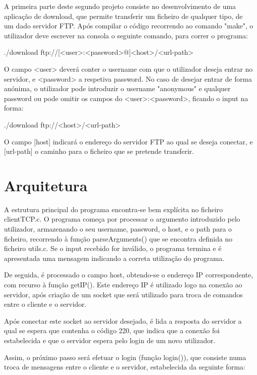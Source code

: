 \documentclass[article, a4paper, 11pt, oneside]{memoir}
\begin{document}
A primeira parte deste segundo projeto consiste no desenvolvimento de uma aplicação de download,
que permite transferir um ficheiro de qualquer tipo, de um dado servidor FTP. Após compilar o código
recorrendo ao comando "make", o utilizador deve escrever na consola o seguinte comando, para correr o programa:

./download ftp://[\textless user\textgreater :\textless password\textgreater @]\textless host\textgreater/\textless url-path\textgreater{}

O campo \textless user\textgreater{} deverá conter o username com que o utilizador deseja entrar no servidor, e \textless password\textgreater{} a respetiva password.
No caso de desejar entrar de forma anónima, o utilizador pode introduzir o username "anonymous" e qualquer password ou
pode omitir os campos do \textless user\textgreater :\textless password\textgreater{}, ficando o input na forma:

./download ftp://\textless host\textgreater /\textless url-path\textgreater{}

O campo [host] indicará o endereço do servidor FTP ao qual se deseja conectar, e [url-path] o caminho para o ficheiro que se pretende transferir.

\section{Arquitetura}

A estrutura principal do programa encontra-se bem explícita no ficheiro clientTCP.c.
O programa começa por processar o argumento introduzido pelo utilizador, armazenando o seu username,
password, o host, e o path para o ficheiro, recorrendo à função parseArguments() que se encontra definida no ficheiro utils.c.
Se o input recebido for inválido, o programa termina e é apresentada uma mensagem indicando a correta utilização do programa.

De seguida, é processado o campo host, obtendo-se o endereço IP correspondente, com recurso à função getIP().
Este endereço IP é utilizado logo na conexão ao servidor, após criação de um socket que será utilizado
para troca de comandos entre o cliente e o servidor.

Após conectar este socket ao servidor desejado, é lida a resposta do servidor a qual se espera que contenha o código 220,
que indica que a conexão foi estabelecida e que o servidor espera pelo login de um novo utilizador. 

Assim, o próximo passo será efetuar o login (função login()), que consiste numa troca de mensagens entre o cliente e o servidor,
estabelecida da seguinte forma:
\end{document}
